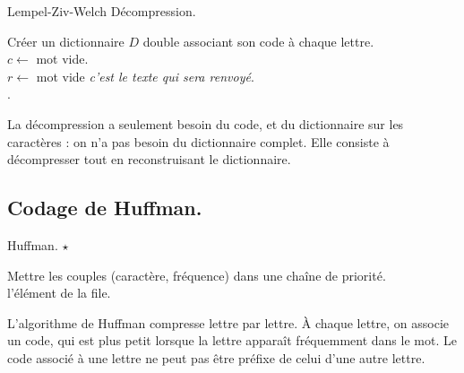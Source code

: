 \documentclass[french, 11pt]{article}
\begin{document}
\vspace*{-0.8cm}

\begin{defi}{Lempel-Ziv-Welch Décompression.}{}
    \begin{algorithm}[H]
        \caption{LZW-Décompression}
        Créer un dictionnaire $D$ double associant son code à chaque lettre.\\
        $c \gets$ mot vide.\\
        $r \gets $ mot vide \emph{c'est le texte qui sera renvoyé}.\\
        .
    \end{algorithm}
    La décompression a seulement besoin du code, et du dictionnaire sur les caractères : on n'a pas besoin du dictionnaire complet. Elle consiste à décompresser tout en reconstruisant le dictionnaire.
\end{defi}

\subsection{Codage de Huffman.}

\begin{defi}{Huffman. $\star$}{}
    \begin{algorithm}[H]
        \caption{Codage de Huffman}
        Mettre les couples (caractère, fréquence) dans une chaîne de priorité.\\
        \Retour l'élément de la file.
    \end{algorithm}
    L'algorithme de Huffman compresse lettre par lettre. À chaque lettre, on associe un code, qui est plus petit lorsque la lettre apparaît fréquemment dans le mot. Le code associé à une lettre ne peut pas être préfixe de celui d'une autre lettre.
\end{defi}

\fin
\end{document}
